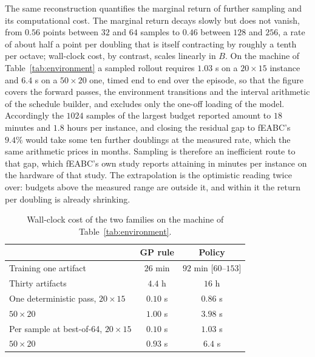 \documentclass[preprint,12pt]{elsarticle}
\theoremstyle{definition}
\theoremstyle{remark}
\begin{document}
The same reconstruction quantifies the marginal return of further
sampling and its computational cost. The marginal return decays
slowly but does not vanish, from $0.56$ points between $32$ and $64$
samples to $0.46$ between $128$ and $256$, a rate of about half a
point per doubling that is itself contracting by roughly a tenth per
octave; wall-clock cost, by contrast, scales linearly in $B$. On the
machine of Table~\ref{tab:environment} a sampled rollout requires
$1.03$ s on a $20{\times}15$ instance and $6.4$ s on a
$50{\times}20$ one, timed end to end over the episode, so that the
figure covers the forward passes, the environment transitions and the
interval arithmetic of the schedule builder, and excludes only the
one-off loading of the model. Accordingly the $1024$ samples of the
largest budget reported amount to $18$ minutes and $1.8$ hours per
instance, and closing the residual gap to fEABC's $9.4\%$ would take
some ten further doublings at the measured rate, which the same
arithmetic prices in months. Sampling is therefore an inefficient
route to that gap, which fEABC's own study reports attaining in
minutes per instance on the hardware of that study. The extrapolation
is the optimistic reading twice over: budgets above the measured
range are outside it, and within it the return per doubling is
already shrinking.

\begin{table}[!htb]
\centering\small
\caption{Wall-clock cost of the two families on the machine of
Table~\ref{tab:environment}.}
\label{tab:cost}
\begin{tabular}{lcc}
\toprule
 & GP rule & Policy \\
\midrule
Training one artifact & $26$ min & $92$ min [$60$--$153$] \\
Thirty artifacts & $4.4$ h & $16$ h \\
\addlinespace
One deterministic pass, $20{\times}15$ & $0.10$ s & $0.86$ s \\
\phantom{One deterministic pass, }$50{\times}20$ & $1.00$ s & $3.98$ s \\
Per sample at best-of-64, $20{\times}15$ & $0.10$ s & $1.03$ s \\
\phantom{Per sample at best-of-64, }$50{\times}20$ & $0.93$ s & $6.4$ s \\
\bottomrule
\end{tabular}
\end{table}
\end{document}
